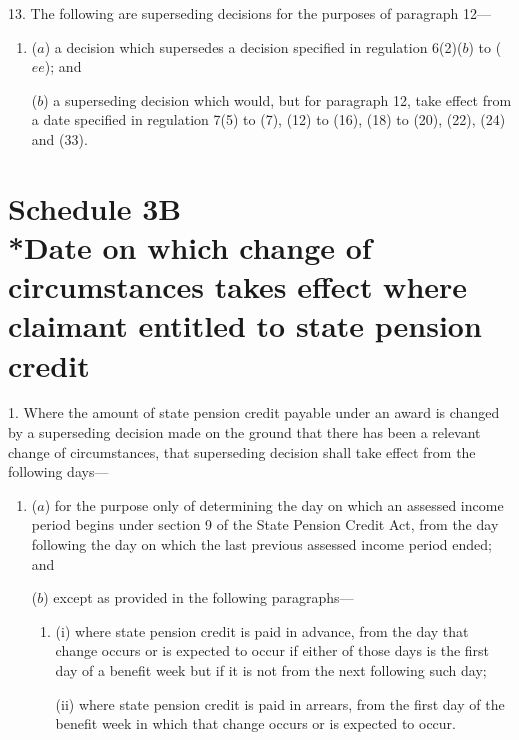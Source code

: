 \documentclass[12pt,a4paper]{article}
\begin{document}
\medskip

13.  The following are superseding decisions for the purposes of paragraph 12—
\begin{enumerate}\item[]
($a$) a decision which supersedes a decision specified in regulation 6(2)($b$)  to ($ee$); and

($b$) a superseding decision which would, but for paragraph 12, take effect from a date specified in regulation 7(5) to (7), (12) to (16), (18) to (20), (22), (24) and (33).
\end{enumerate}


\part[Schedule 3B --- Date on which change of circumstances takes effect where claimant entitled to state pension credit]{Schedule 3B\\*Date on which change of circumstances takes effect where claimant entitled to state pension credit}

\renewcommand\parthead{--- Schedule 3B}


\medskip

1.  Where the amount of state pension credit payable under an award is changed by a superseding decision made on the ground that there has been a relevant change of circumstances, that superseding decision shall take effect from the following days—
\begin{enumerate}\item[]
($a$) for the purpose only of determining the day on which an assessed income period begins under section 9 of the State Pension Credit Act, from the day following the day on which the last previous assessed income period ended; and


($b$) except as provided in the following paragraphs---
\begin{enumerate}\item[]
(i) where state pension credit is paid in advance, from the day that change occurs or is expected to occur if either of those days is the first day of a benefit week but if it is not from the next following such day;

(ii) where state pension credit is paid in arrears, from the first day of the benefit week in which that change occurs or is expected to occur.
\end{enumerate}
\end{enumerate}
\end{document}
